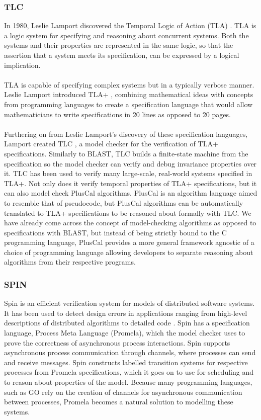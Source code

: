 \subsubsection*{\textbf{TLC}}
In 1980, Leslie Lamport discovered the Temporal Logic of Action (TLA) \cite{tla}. TLA is a logic system for specifying and reasoning about concurrent systems. Both the systems and their properties are represented in the same logic, so that the assertion that a system meets its specification, can be expressed by a logical implication.
\\ \\
TLA is capable of specifying complex systems but in a typically verbose manner. Leslie Lamport introduced TLA+ \cite{tlaplus}, combining mathematical ideas with concepts from programming languages to create a specification language that would allow mathematicians to write specifications in 20 lines as opposed to 20 pages.
\\ \\
Furthering on from Leslie Lamport's discovery of these specification languages, Lamport created TLC \cite{tlc}, a model checker for the verification of TLA+ specifications. Similarly to BLAST, TLC builds a finite-state machine from the specification so the model checker can verify and debug invariance properties over it. TLC has been used to verify many large-scale, real-world systems specified in TLA+. Not only does it verify temporal properties of TLA+ specifications, but it can also model check PlusCal \cite{pluscal} algorithms. PlusCal is an algorithm language aimed to resemble that of pseudocode, but PlusCal algorithms can be automatically translated to TLA+ specifications to be reasoned about formally with TLC. We have already come across the concept of model-checking algorithms as opposed to specifications with BLAST, but instead of being strictly bound to the C programming language, PlusCal provides a more general framework agnostic of a choice of programming language allowing developers to separate reasoning about algorithms from their respective programs.

\subsubsection*{\textbf{SPIN}}
Spin is an efficient verification system for models of distributed software systems. It has been used to detect design errors in applications ranging from high-level descriptions of distributed algorithms to detailed code \cite{spin}. Spin has a specification language, Process Meta Language (Promela), which the model checker uses to prove the correctness of asynchronous process interactions. Spin supports asynchronous process communication through channels, where processes can send and receive messages. Spin constructs labelled transition systems for respective processes from Promela specifications, which it goes on to use for scheduling and to reason about properties of the model. Because many programming languages, such as GO \cite{go} rely on the creation of channels for asynchronous communication between processes, Promela becomes a natural solution to modelling these systems.
